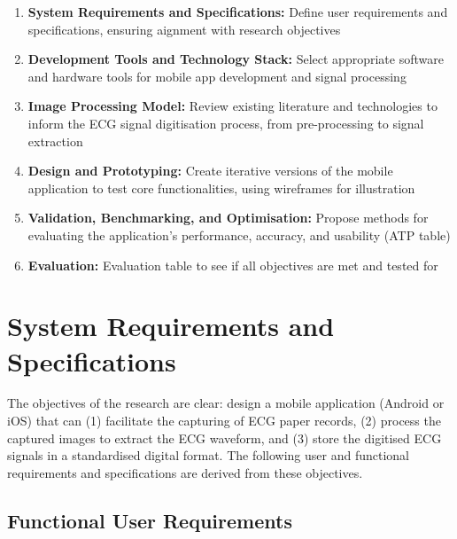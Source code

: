 \begin{enumerate}
	\item \textbf{System Requirements and Specifications:} Define user requirements and specifications, ensuring aignment with research objectives
	\item \textbf{Development Tools and Technology Stack:} Select appropriate software and hardware tools for mobile app development and signal processing
	\item \textbf{Image Processing Model:} Review existing literature and technologies to inform the ECG signal digitisation process, from pre-processing to signal extraction
	\item \textbf{Design and Prototyping:} Create iterative versions of the mobile application to test core functionalities, using wireframes for illustration
	\item \textbf{Validation, Benchmarking, and Optimisation:} Propose methods for evaluating the application's performance, accuracy, and usability (ATP table)
	\item \textbf{Evaluation:} Evaluation table to see if all objectives are met and tested for
\end{enumerate}


\section{System Requirements and Specifications}

The objectives of the research are clear: design a mobile application (Android or iOS) that can (1) facilitate the capturing of ECG paper records, (2) process the captured images to extract the ECG waveform, and (3) store the digitised ECG signals in a standardised digital format. The following user and functional requirements and specifications are derived from these objectives. 

\subsection{Functional User Requirements}


